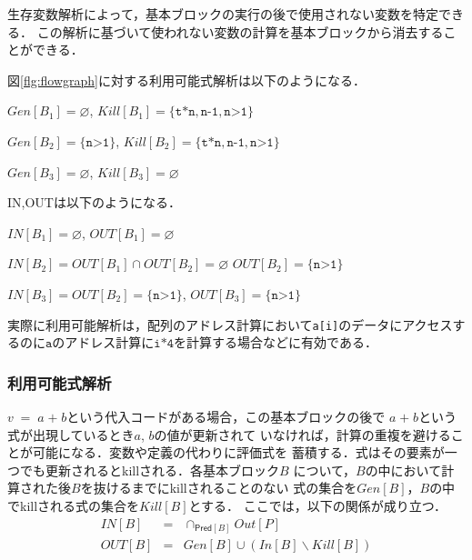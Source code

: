 \documentclass[dvipdfmx,a4j]{jbook}
\begin{document}
生存変数解析によって，基本ブロックの実行の後で使用されない変数を特定できる．
この解析に基づいて使われない変数の計算を基本ブロックから消去することができる．

図\ref{flg:flowgraph}に対する利用可能式解析は以下のようになる．
\begin{trivlist}
    \item $Gen[B_1]=\varnothing$, $Kill[B_1]=\{\texttt{t*n},\texttt{n-1},\texttt{n>1}\}$
    \item $Gen[B_2]=\{\texttt{n>1}\}$, $Kill[B_2]=\{\texttt{t*n},\texttt{n-1},\texttt{n>1}\}$
    \item $Gen[B_3]=\varnothing$, $Kill[B_3]=\varnothing$
\end{trivlist}

IN,OUTは以下のようになる．
\begin{trivlist}
    \item $IN[B_1]=\varnothing$, $OUT[B_1]=\varnothing$
    \item $IN[B_2]=OUT[B_1]\cap OUT[B_2]=\varnothing$
    $OUT[B_2]=\{\texttt{n>1}\}$
    \item $IN[B_3]=OUT[B_2]=\{\texttt{n>1}\}$, $OUT[B_3]=\{\texttt{n>1}\}$
\end{trivlist}

実際に利用可能解析は，配列のアドレス計算において\texttt{a[i]}のデータにアクセスするのに$\texttt{a}$のアドレス計算に$\texttt{i*4}$を計算する場合などに有効である．

\subsubsection{利用可能式解析}

$v\;=\;a\;\texttt{+}\;b$という代入コードがある場合，この基本ブロックの後で
$a\;\texttt{+}\;b$という式が出現しているとき$a$, $b$の値が更新されて
いなければ，計算の重複を避けることが可能になる．変数や定義の代わりに評価式を
蓄積する．式はその要素が一つでも更新されるとkillされる．各基本ブロック$B$
について，$B$の中において計算された後$B$を抜けるまでにkillされることのない
式の集合を$Gen[B]$，$B$の中でkillされる式の集合を$Kill[B]$とする．
ここでは，以下の関係が成り立つ．
\begin{eqnarray}
    IN[B] & = & \cap_{\mathsf{Pred}[B]}Out[P]\\
    OUT[B] & = & Gen[B]\cup(In[B]\backslash Kill[B])
\end{eqnarray}



\end{document}
